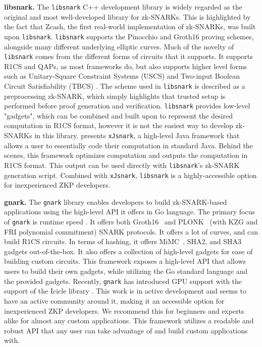 \textbf{libsnark.} The \texttt{libsnark} C++ development library \cite{libsnark} is widely regarded as the original and most well-developed library for zk-SNARKs. This is highlighted by the fact that Zcash, the first real-world implementation of zk-SNARKs, was built upon \texttt{libsnark}. \texttt{libsnark} supports the Pinocchio \cite{parno2016pinocchio} and Groth16 \cite{groth16} proving schemes, alongside many different underlying elliptic curves. Much of the novelty of \texttt{libsnark} comes from the different forms of circuits that it supports. It supports R1CS and QAPs, as most frameworks do, but also supports higher level forms such as Unitary-Square Constraint Systems (USCS) and Two-input Boolean Circuit Satisfiability (TBCS) \cite{uscs}. The scheme used in \texttt{libsnark} is described as a preprocessing zk-SNARK, which simply highlights that trusted setup is performed before proof generation and verification. \texttt{libsnark} provides low-level "gadgets", which can be combined and built upon to represent the desired computation in R1CS format, however it is not the easiest way to develop zk-SNARKs in this library. \cite{kosba2018xjsnark} presents \texttt{xJsnark}, a high-level Java framework that allows a user to essentially code their computation in standard Java. Behind the scenes, this framework optimizes computation and outputs the computation in R1CS format. This output can be used directly with \texttt{libsnark}'s zk-SNARK generation script. Combined with \texttt{xJsnark}, \texttt{libsnark} is a highly-accessible option for inexperienced ZKP developers.

\textbf{gnark.} The \texttt{gnark} library \cite{gnark-v0.9.0} enables developers to build zk-SNARK-based applications using the high-level API it offers in Go language. The primary focus of \texttt{gnark} is runtime speed \cite{ConsenSys2023Gnark}. It offers both Groth16~\cite{groth16} and PLONK~\cite{plonk} (with KZG and FRI polynomial commitment) SNARK protocols. It offers a lot of curves, and can build R1CS circuits. In terms of hashing, it offers MiMC~\cite{mimchash}, SHA2, and SHA3 gadgets out-of-the-box. It also offers a collection of high-level gadgets for ease of building custom circuits. This framework exposes a high-level API that allows users to build their own gadgets, while utilizing the Go standard language and the provided gadgets. Recently, \texttt{gnark} has introduced GPU support with the support of the Icicle library \cite{icicle}. This work is in active development and seems to have an active community around it, making it an accessible option for inexperienced ZKP developers. We recommend this for beginners and experts alike for almost any custom applications. This framework utilizes a readable and robust API that any user can take advantage of and build custom applications with.

